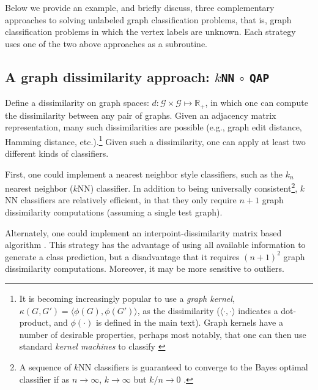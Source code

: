 \documentclass{article} %
\providecommand{\mc}[1]{\mathcal{#1}}
\newcommand{\Real}{\mathbb{R}}
\newcommand{\conv}{\rightarrow}
\newcommand{\qap}{\texttt{QAP} }
\begin{document}
Below we provide an example, and briefly discuss, three complementary approaches to solving unlabeled graph classification problems, that is, graph classification problems in which the vertex labels are unknown.  Each strategy uses one of the two above approaches as a subroutine.

\subsection{A graph dissimilarity approach: \texttt{$k$NN} $\circ$ \qap} %
\label{ssub:_k_nn_circ_qap}

Define a dissimilarity on graph spaces: $d: \mc{G} \times \mc{G} \mapsto \Real_+$, in which one can compute the dissimilarity between any pair of graphs. Given an adjacency matrix representation, many such dissimilarities are possible (e.g., graph edit distance, Hamming distance, etc.).\footnote{It is becoming increasingly popular to use a \emph{graph kernel}, $\kappa(G,G')=\langle \phi(G), \phi(G') \rangle$, as the dissimilarity \cite{Bunke2011} ($\langle \cdot, \cdot \rangle$ indicates a dot-product, and $\phi(\cdot)$ is defined in the main text).  Graph kernels have a number of desirable properties, perhaps most notably, that one can then use standard \emph{kernel machines} to classify \cite{Vapnik1998}}	Given such a dissimilarity, one can apply at least two different kinds of classifiers.


First, one could implement a nearest neighbor style classifiers, such as the $k_n$ nearest neighbor ($k$NN) classifier.  In addition to being universally consistent\footnote{A sequence of $k$NN classifiers is guaranteed to converge to the Bayes optimal classifier  if  as $n \conv \infty$, $k \conv \infty$ but $k/n \conv 0$ \cite{Devroye1997}.}, $k$NN classifiers are relatively efficient, in that they only require $n+1$ graph dissimilarity computations (assuming a single test graph).  

Alternately, one could implement an interpoint-dissimilarity matrix based algorithm \cite{Duin2011}. This strategy has the advantage of using all available information to generate a class prediction, but a disadvantage that it requires $(n+1)^2$ graph dissimilarity computations. Moreover, it may be more sensitive to outliers.
\end{document}
